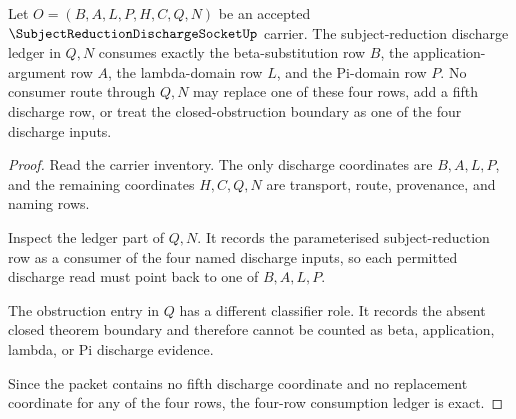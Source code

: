 \begin{theorem}
\label{thm:subject-reduction-discharge-socket-four-row-ledger-exactness}
Let $O=(B,A,L,P,H,C,Q,N)$ be an accepted $\SubjectReductionDischargeSocketUp$ carrier. The subject-reduction discharge ledger in $Q,N$ consumes exactly the beta-substitution row $B$, the application-argument row $A$, the lambda-domain row $L$, and the Pi-domain row $P$. No consumer route through $Q,N$ may replace one of these four rows, add a fifth discharge row, or treat the closed-obstruction boundary as one of the four discharge inputs.
\end{theorem}
\begin{proof}
Read the carrier inventory. The only discharge coordinates are $B,A,L,P$, and the remaining coordinates $H,C,Q,N$ are transport, route, provenance, and naming rows.

Inspect the ledger part of $Q,N$. It records the parameterised subject-reduction row as a consumer of the four named discharge inputs, so each permitted discharge read must point back to one of $B,A,L,P$.

The obstruction entry in $Q$ has a different classifier role. It records the absent closed theorem boundary and therefore cannot be counted as beta, application, lambda, or Pi discharge evidence.

Since the packet contains no fifth discharge coordinate and no replacement coordinate for any of the four rows, the four-row consumption ledger is exact.
\end{proof}

